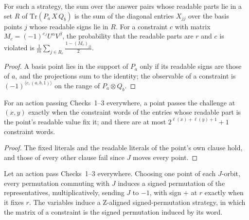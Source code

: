 \begin{lemma}
\label{lem:trace-identity}
\leanok
For such a strategy, the sum over the answer pairs whose readable parts lie in a set $R$ of
$\mathrm{Tr}(P_a\, X\, Q_b)$ is the sum of the diagonal entries $X_{jj}$ over the basis points $j$
whose readable signs lie in $R$. For a constraint $c$ with matrix $M_c = (-1)^{c_J} U^{\alpha}
V^{\beta}$, the probability that the readable parts are $r$ and $c$ is violated is
$\frac1m \sum_{j \in R_r} \frac{1 - (M_c)_{jj}}{2}$.
\end{lemma}

\begin{proof}
\leanok
A basis point lies in the support of $P_a$ only if its readable signs are those of $a$, and the
projections sum to the identity; the observable of a constraint is $(-1)^{\langle c, (a, b, 1)
\rangle}$ on the range of $P_a \otimes Q_b$.
\end{proof}

\begin{lemma}
\label{lem:assoc-passes}
\leanok
For an action passing Checks~1--3 everywhere, a point passes the challenge at $(x, y)$ exactly
when the constraint words of the entries whose readable part is the point's readable value fix
it; and there are at most $2^{\ell(x) + \ell(y) + 1} + 1$ constraint words.
\end{lemma}

\begin{proof}
\leanok
The fixed literals and the readable literals of the point's own clause hold, and those of every
other clause fail since $J$ moves every point.
\end{proof}

\begin{lemma}
\label{lem:j-quotient}
\leanok
Let an action pass Checks~1--3 everywhere. Choosing one point of each $J$-orbit, every
permutation commuting with $J$ induces a signed permutation of the representatives,
multiplicatively, sending $J$ to $-1$, with sign $+$ at $r$ exactly when it fixes $r$. The
variables induce a Z-aligned signed-permutation strategy, in which the matrix of a constraint is
the signed permutation induced by its word.
\end{lemma}


